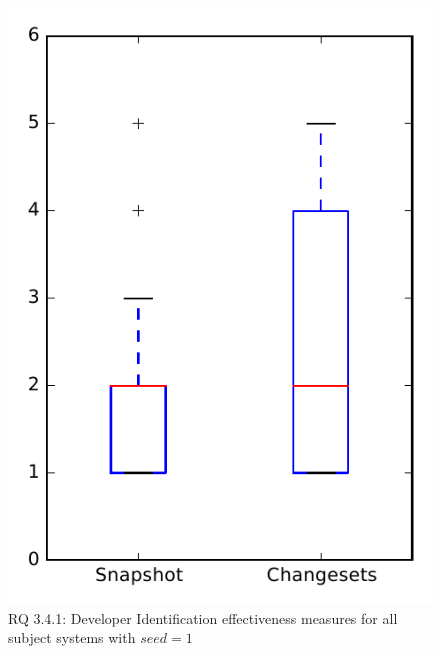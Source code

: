 
\begin{figure}
\centering
\includegraphics[height=0.4\textheight]{figures/dit_seed/rq1_overview_1}
\caption{RQ 3.4.1: Developer Identification effectiveness measures for all subject systems with $seed=1$}
\label{fig:dit_seed:rq1:overview}
\end{figure}
